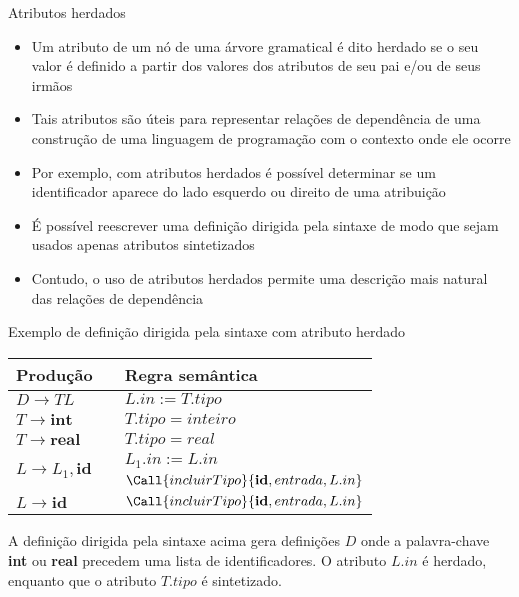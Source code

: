 \begin{frame}[fragile]{Atributos herdados}

    \begin{itemize}
        \item Um atributo de um nó de uma árvore gramatical é dito herdado se o seu valor é definido a partir dos valores dos atributos
            de seu pai e/ou de seus irmãos

        \item Tais atributos são úteis para representar relações de dependência de uma construção de uma linguagem de programação com
            o contexto onde ele ocorre

        \item Por exemplo, com atributos herdados é possível determinar se um identificador aparece do lado esquerdo ou direito de
            uma atribuição

        \item É possível reescrever uma definição dirigida pela sintaxe de modo que sejam usados apenas atributos sintetizados

        \item Contudo, o uso de atributos herdados permite uma descrição mais natural das relações de dependência
    \end{itemize}

\end{frame}

\begin{frame}[fragile]{Exemplo de definição dirigida pela sintaxe com atributo herdado}

    \begin{table}
        \centering
        \begin{tabular}{lp{2cm}l} 
        \toprule
        \textbf{Produção} & & \textbf{Regra semântica} \\
        \midrule
        \rowcolor[gray]{0.9}
        $D\to TL$ & & $L.in := T.tipo$ \\
        $T\to \textbf{int}$ & & $T.tipo = inteiro$ \\
        \rowcolor[gray]{0.9}
        $T\to \textbf{real}$ & & $T.tipo = real$ \\
        \multirow{2}{*}{$L\to L_1, \textbf{id}$} & & $L_1.in := L.in$ \\
        & & $\Call{incluirTipo}{\textbf{id}, entrada, L.in}$ \\
        \rowcolor[gray]{0.9}
        $L\to \textbf{id}$ & & $\Call{incluirTipo}{\textbf{id}, entrada, L.in}$ \\
        \bottomrule
        \end{tabular}
    \end{table}

    \vspace{0.2in}

    A definição dirigida pela sintaxe acima gera definições $D$ onde a palavra-chave \textbf{int} ou \textbf{real} precedem uma lista
        de identificadores. O atributo $L.in$ é herdado, enquanto que o atributo $T.tipo$ é sintetizado.
\end{frame}

